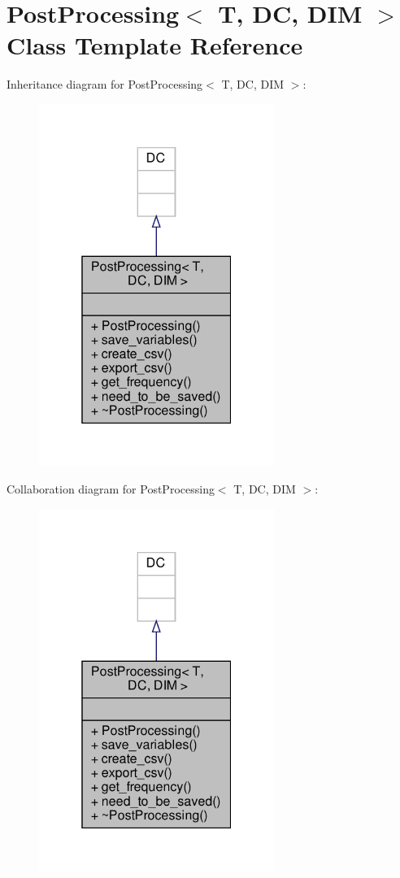 \hypertarget{classPostProcessing}{}\section{Post\+Processing$<$ T, DC, D\+IM $>$ Class Template Reference}
\label{classPostProcessing}


Inheritance diagram for Post\+Processing$<$ T, DC, D\+IM $>$\+:\nopagebreak
\begin{figure}[H]
\begin{center}
\leavevmode
\includegraphics[width=217pt]{classPostProcessing__inherit__graph}
\end{center}
\end{figure}


Collaboration diagram for Post\+Processing$<$ T, DC, D\+IM $>$\+:\nopagebreak
\begin{figure}[H]
\begin{center}
\leavevmode
\includegraphics[width=217pt]{classPostProcessing__coll__graph}
\end{center}
\end{figure}
